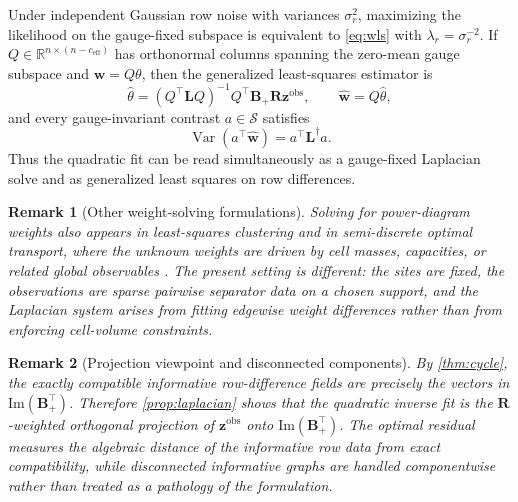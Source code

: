 \documentclass[preprint,12pt]{elsarticle}
\newtheorem{remark}{Remark}
\newcommand{\R}{\mathbb{R}}
\newcommand{\weights}{\mathbf{w}}
\newcommand{\inc}{\mathbf{B}}
\newcommand{\lap}{\mathbf{L}}
\begin{document}
Under independent Gaussian row noise with variances $\sigma_r^2$,
maximizing the likelihood on the gauge-fixed subspace is equivalent to
\eqref{eq:wls} with $\lambda_r=\sigma_r^{-2}$. If
$Q\in\R^{n\times (n-c_{\mathrm{eff}})}$ has orthonormal columns spanning the
zero-mean gauge subspace and $\weights=Q\theta$, then the generalized
least-squares estimator is
\begin{equation}
    \widehat{\theta}=(Q^\top\lap Q)^{-1}Q^\top \inc_+ \mathbf{R}\mathbf{z}^{\mathrm{obs}},
    \qquad
    \widehat{\weights}=Q\widehat{\theta},
\end{equation}
and every gauge-invariant contrast $a\in\mathcal{S}$ satisfies
\begin{equation}
    \operatorname{Var}(a^\top\widehat{\weights}) = a^\top \lap^\dagger a.
\end{equation}
Thus the quadratic fit can be read simultaneously as a gauge-fixed Laplacian
solve and as generalized least squares on row differences.

\begin{remark}[Other weight-solving formulations]
Solving for power-diagram weights also appears in least-squares clustering and
in semi-discrete optimal transport, where the unknown weights are driven by
cell masses, capacities, or related global observables
\cite{AurenhammerHoffmannAronov1998,KitagawaMerigotThibert2019}. The present
setting is different: the sites are fixed, the observations are sparse pairwise
separator data on a chosen support, and the Laplacian system arises from
fitting edgewise weight differences rather than from enforcing cell-volume
constraints.
\end{remark}

\begin{remark}[Projection viewpoint and disconnected components]
\label{rem:projection}
By \cref{thm:cycle}, the exactly compatible informative row-difference fields
are precisely the vectors in $\mathrm{Im}(\inc_+^\top)$. Therefore
\cref{prop:laplacian} shows that the quadratic inverse fit is the
$\mathbf{R}$-weighted orthogonal projection of $\mathbf{z}^{\mathrm{obs}}$ onto
$\mathrm{Im}(\inc_+^\top)$. The optimal residual measures the algebraic
distance of the informative row data from exact compatibility, while
disconnected informative graphs are handled componentwise rather than treated
as a pathology of the formulation.
\end{remark}
\end{document}
